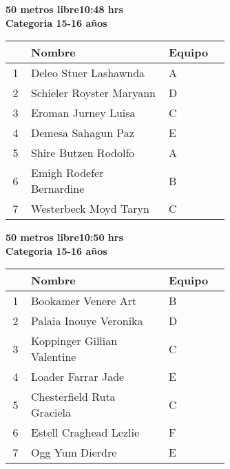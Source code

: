 \begin{minipage}{0.95\linewidth}\vspace{0.5cm} 
\begin{flushleft}
\textbf{
\hspace{-0.15cm}50 metros libre\hspace{1.5cm}10:48 hrs \\Categoria 15-16 años}\vspace{-0.2cm} 
\end{flushleft}
\begin{tabular}{cp{0.63\linewidth}l}
\hline
& \textbf{Nombre} & \textbf{Equipo} \\ \hline
1 & Deleo Stuer Lashawnda & A \\ 
2 & Schieler Royster Maryann & D \\ 
3 & Eroman Jurney Luisa & C \\ 
4 & Demesa Sahagun Paz & E \\ 
5 & Shire Butzen Rodolfo & A \\ 
6 & Emigh Rodefer Bernardine & B \\ 
7 & Westerbeck Moyd Taryn & C \\ 
\end{tabular}
\end{minipage}
\begin{minipage}{0.95\linewidth}\vspace{0.5cm} 
\begin{flushleft}
\textbf{
\hspace{-0.15cm}50 metros libre\hspace{1.5cm}10:50 hrs \\Categoria 15-16 años}\vspace{-0.2cm} 
\end{flushleft}
\begin{tabular}{cp{0.63\linewidth}l}
\hline
& \textbf{Nombre} & \textbf{Equipo} \\ \hline
1 & Bookamer Venere Art & B \\ 
2 & Palaia Inouye Veronika & D \\ 
3 & Koppinger Gillian Valentine & C \\ 
4 & Loader Farrar Jade & E \\ 
5 & Chesterfield Ruta Graciela & C \\ 
6 & Estell Craghead Lezlie & F \\ 
7 & Ogg Yum Dierdre & E \\ 
\end{tabular}
\end{minipage}
